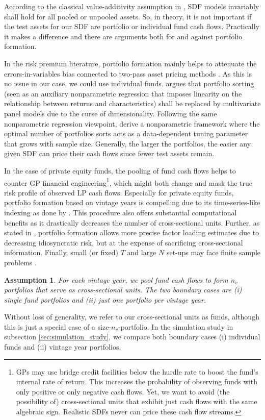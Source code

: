 \documentclass[12pt]{article}
\newtheorem{assume}{Assumption}
\begin{document}
According to the classical value-additivity assumption in \cite{HR87}, SDF models invariably shall hold for all pooled or unpooled assets.
So, in theory, it is not important if the test assets for our SDF are portfolio or individual fund cash flows.
Practically it makes a difference and there are arguments both for and against portfolio formation.

In the risk premium literature, portfolio formation mainly helps to attenuate the errors-in-variables bias connected to two-pass asset pricing methods \citep{JNPR19,PRS19}.
As this is no issue in our case, we could use individual funds.
\cite{C11} argues that portfolio sorting (seen as an auxiliary nonparametric regression that imposes linearity on the relationship between returns and characteristics) shall be replaced by multivariate panel models due to the curse of dimensionality.
Following the same nonparametric regression viewpoint, \cite{CCF19} derive a nonparametric framework where the optimal number of portfolios sorts acts as a data-dependent tuning parameter that grows with sample size.
Generally, the larger the portfolios, the easier any given SDF can price their cash flows since fewer test assets remain.

In the case of private equity funds, the pooling of fund cash flows helps to counter GP financial engineering\footnote{GPs may use bridge credit facilities below the hurdle rate to boost the fund's internal rate of return. This increases the probability of observing funds with only positive or only negative cash flows. Yet, we want to avoid (the possibility of) cross-sectional units that exhibit just cash flows with the same algebraic sign. Realistic SDFs never can price these cash flow streams.}, which might both change and mask the true risk profile of observed LP cash flows.
Especially for private equity funds, portfolio formation based on vintage years is compelling due to its time-series-like indexing as done by \cite{DLP12}.
This procedure also offers substantial computational benefits as it drastically decreases the number of cross-sectional units.
Further, as stated in \cite{ALS20}, portfolio formation allows more precise factor loading estimates  due to decreasing idiosyncratic risk, but at the expense of sacrificing cross-sectional information.
Finally, small (or fixed) $T$ and large $N$ set-ups may face finite sample problems \citep{RRZ20}.

\begin{assume}
	\label{as:portfolio}
	For each vintage year, we pool fund cash flows to form $n_v$ portfolios that serve as cross-sectional units.
	The two boundary cases are (i) single fund portfolios and (ii) just one portfolio per vintage year. 
\end{assume}
Without loss of generality, we refer to our cross-sectional units as funds, although this is just a special case of a size-$n_v$-portfolio.
In the simulation study in subsection \ref{sec:simulation_study}, we compare both boundary cases (i) individual funds and (ii) vintage year portfolios.
\end{document}
